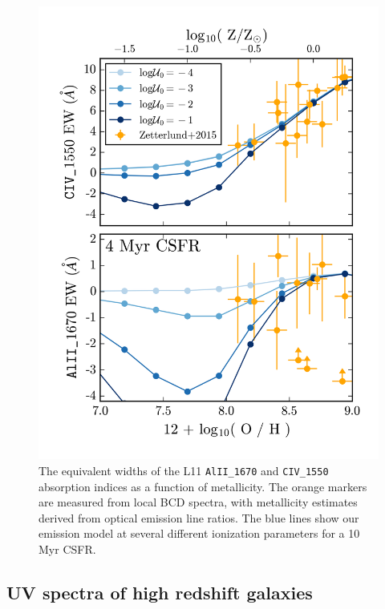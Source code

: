 \documentclass[preprint2,trackchanges]{aastex62}
\newcommand{\Myr}{$\,$Myr\xspace}
\begin{document}
\begin{figure}
  \begin{center}
    \includegraphics[width=\linewidth]{figs/f18.png}
    \caption{The equivalent widths of the L11 \texttt{AlII\_1670} and \texttt{CIV\_1550} absorption indices as a function of metallicity. The orange markers are measured from local BCD spectra, with metallicity estimates derived from optical emission line ratios. The blue lines show our emission model at several different ionization parameters for a 10\Myr CSFR.}
    \label{fig:BCDabs}
  \end{center}
\end{figure}

\subsection{UV spectra of high redshift galaxies} \label{sec:obs:UV:LBGs}
\end{document}
